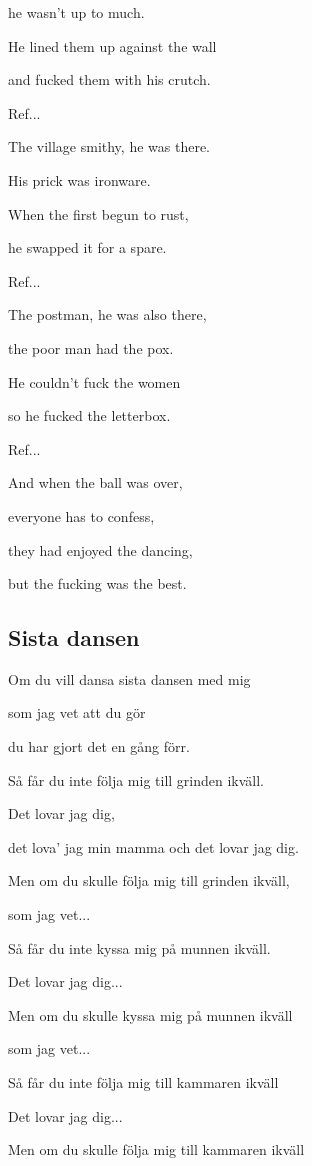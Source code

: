 he wasn't up to much.

He lined them up against the wall

and fucked them with his crutch.\bigskip


Ref...\bigskip


The village smithy, he was there.

His prick was ironware.

When the first begun to rust,

he swapped it for a spare.\bigskip


Ref...\bigskip


The postman, he was also there,

the poor man had the pox.

He couldn't fuck the women

so he fucked the letterbox.\bigskip


Ref...\bigskip


And when the ball was over,

everyone has to confess,

they had enjoyed the dancing,

but the fucking was the best. 


\subsection{\textbf{Sista dansen}}

Om du vill dansa sista dansen med mig

som jag vet att du gör

du har gjort det en gång förr.

Så får du inte följa mig till grinden ikväll.

Det lovar jag dig,

det lova' jag min mamma och det lovar jag dig.\bigskip


Men om du skulle följa mig till grinden ikväll,

som jag vet...

Så får du inte kyssa mig på munnen ikväll.

Det lovar jag dig...\bigskip


Men om du skulle kyssa mig på munnen ikväll

som jag vet...

Så får du inte följa mig till kammaren ikväll

Det lovar jag dig...\bigskip


Men om du skulle följa mig till kammaren ikväll

